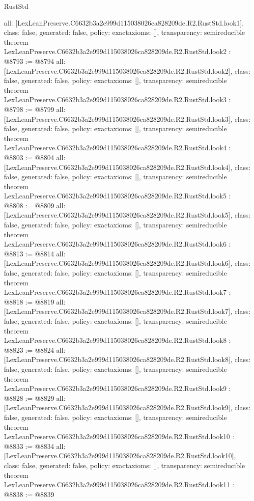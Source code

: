 \begin{lexlean}{RustStd}
\begin{coremodule}
{  all: [LexLeanPreserve.C6632b3a2e999d115038026ca828209de.R2.RustStd.look1],
  class: false,
  generated: false,
  policy: exact{axioms: []},
  transparency: semireducible
}
theorem LexLeanPreserve.C6632b3a2e999d115038026ca828209de.R2.RustStd.look2 : @8793 := @8794 {
  all: [LexLeanPreserve.C6632b3a2e999d115038026ca828209de.R2.RustStd.look2],
  class: false,
  generated: false,
  policy: exact{axioms: []},
  transparency: semireducible
}
theorem LexLeanPreserve.C6632b3a2e999d115038026ca828209de.R2.RustStd.look3 : @8798 := @8799 {
  all: [LexLeanPreserve.C6632b3a2e999d115038026ca828209de.R2.RustStd.look3],
  class: false,
  generated: false,
  policy: exact{axioms: []},
  transparency: semireducible
}
theorem LexLeanPreserve.C6632b3a2e999d115038026ca828209de.R2.RustStd.look4 : @8803 := @8804 {
  all: [LexLeanPreserve.C6632b3a2e999d115038026ca828209de.R2.RustStd.look4],
  class: false,
  generated: false,
  policy: exact{axioms: []},
  transparency: semireducible
}
theorem LexLeanPreserve.C6632b3a2e999d115038026ca828209de.R2.RustStd.look5 : @8808 := @8809 {
  all: [LexLeanPreserve.C6632b3a2e999d115038026ca828209de.R2.RustStd.look5],
  class: false,
  generated: false,
  policy: exact{axioms: []},
  transparency: semireducible
}
theorem LexLeanPreserve.C6632b3a2e999d115038026ca828209de.R2.RustStd.look6 : @8813 := @8814 {
  all: [LexLeanPreserve.C6632b3a2e999d115038026ca828209de.R2.RustStd.look6],
  class: false,
  generated: false,
  policy: exact{axioms: []},
  transparency: semireducible
}
theorem LexLeanPreserve.C6632b3a2e999d115038026ca828209de.R2.RustStd.look7 : @8818 := @8819 {
  all: [LexLeanPreserve.C6632b3a2e999d115038026ca828209de.R2.RustStd.look7],
  class: false,
  generated: false,
  policy: exact{axioms: []},
  transparency: semireducible
}
theorem LexLeanPreserve.C6632b3a2e999d115038026ca828209de.R2.RustStd.look8 : @8823 := @8824 {
  all: [LexLeanPreserve.C6632b3a2e999d115038026ca828209de.R2.RustStd.look8],
  class: false,
  generated: false,
  policy: exact{axioms: []},
  transparency: semireducible
}
theorem LexLeanPreserve.C6632b3a2e999d115038026ca828209de.R2.RustStd.look9 : @8828 := @8829 {
  all: [LexLeanPreserve.C6632b3a2e999d115038026ca828209de.R2.RustStd.look9],
  class: false,
  generated: false,
  policy: exact{axioms: []},
  transparency: semireducible
}
theorem LexLeanPreserve.C6632b3a2e999d115038026ca828209de.R2.RustStd.look10 : @8833 := @8834 {
  all: [LexLeanPreserve.C6632b3a2e999d115038026ca828209de.R2.RustStd.look10],
  class: false,
  generated: false,
  policy: exact{axioms: []},
  transparency: semireducible
}
theorem LexLeanPreserve.C6632b3a2e999d115038026ca828209de.R2.RustStd.look11 : @8838 := @8839 {
}
\end{coremodule}
\end{lexlean}
